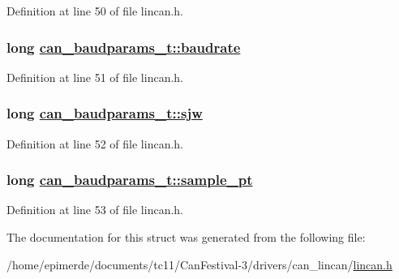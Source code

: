 Definition at line 50 of file lincan.h.\hypertarget{structcan__baudparams__t_b9e5b5418206d02cc1ff852b6bc61d5e}{
\subsubsection[baudrate]{\setlength{\rightskip}{0pt plus 5cm}long \hyperlink{structcan__baudparams__t_b9e5b5418206d02cc1ff852b6bc61d5e}{can\_\-baudparams\_\-t::baudrate}}}
\label{structcan__baudparams__t_b9e5b5418206d02cc1ff852b6bc61d5e}




Definition at line 51 of file lincan.h.\hypertarget{structcan__baudparams__t_a81e104a371b1efc2cc08031afac924c}{
\subsubsection[sjw]{\setlength{\rightskip}{0pt plus 5cm}long \hyperlink{structcan__baudparams__t_a81e104a371b1efc2cc08031afac924c}{can\_\-baudparams\_\-t::sjw}}}
\label{structcan__baudparams__t_a81e104a371b1efc2cc08031afac924c}




Definition at line 52 of file lincan.h.\hypertarget{structcan__baudparams__t_b5d2e0ccd2e1f474d9e9d08d3d7fa9ed}{
\subsubsection[sample\_\-pt]{\setlength{\rightskip}{0pt plus 5cm}long \hyperlink{structcan__baudparams__t_b5d2e0ccd2e1f474d9e9d08d3d7fa9ed}{can\_\-baudparams\_\-t::sample\_\-pt}}}
\label{structcan__baudparams__t_b5d2e0ccd2e1f474d9e9d08d3d7fa9ed}




Definition at line 53 of file lincan.h.

The documentation for this struct was generated from the following file:\begin{CompactItemize}
\item 
/home/epimerde/documents/tc11/Can\-Festival-3/drivers/can\_\-lincan/\hyperlink{lincan_8h}{lincan.h}\end{CompactItemize}
